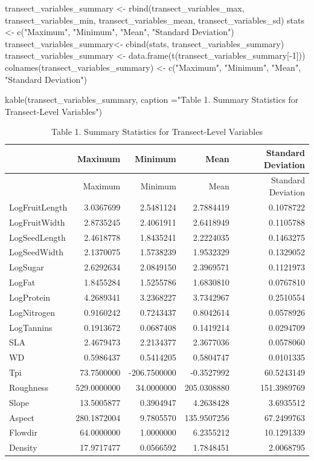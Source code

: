 \documentclass[
  12pt,
]{article}
\newenvironment{Shaded}{\begin{snugshade}}{\end{snugshade}}
\newcommand{\AttributeTok}[1]{\textcolor[rgb]{0.77,0.63,0.00}{#1}}
\newcommand{\DecValTok}[1]{\textcolor[rgb]{0.00,0.00,0.81}{#1}}
\newcommand{\FunctionTok}[1]{\textcolor[rgb]{0.00,0.00,0.00}{#1}}
\newcommand{\NormalTok}[1]{#1}
\newcommand{\OtherTok}[1]{\textcolor[rgb]{0.56,0.35,0.01}{#1}}
\newcommand{\SpecialCharTok}[1]{\textcolor[rgb]{0.00,0.00,0.00}{#1}}
\newcommand{\StringTok}[1]{\textcolor[rgb]{0.31,0.60,0.02}{#1}}
\begin{document}
\begin{Shaded}
\begin{Highlighting}[]
\NormalTok{transect\_variables\_summary }\OtherTok{\textless{}{-}} \FunctionTok{rbind}\NormalTok{(transect\_variables\_max, transect\_variables\_min, transect\_variables\_mean, transect\_variables\_sd)}
\NormalTok{stats }\OtherTok{\textless{}{-}} \FunctionTok{c}\NormalTok{(}\StringTok{"Maximum"}\NormalTok{, }\StringTok{"Minimum"}\NormalTok{, }\StringTok{"Mean"}\NormalTok{, }\StringTok{"Standard Deviation"}\NormalTok{)}
\NormalTok{transect\_variables\_summary}\OtherTok{\textless{}{-}} \FunctionTok{cbind}\NormalTok{(stats, transect\_variables\_summary)}
\NormalTok{transect\_variables\_summary }\OtherTok{\textless{}{-}} \FunctionTok{data.frame}\NormalTok{(}\FunctionTok{t}\NormalTok{(transect\_variables\_summary[}\SpecialCharTok{{-}}\DecValTok{1}\NormalTok{]))}
\FunctionTok{colnames}\NormalTok{(transect\_variables\_summary) }\OtherTok{\textless{}{-}} \FunctionTok{c}\NormalTok{(}\StringTok{"Maximum"}\NormalTok{, }\StringTok{"Minimum"}\NormalTok{, }\StringTok{"Mean"}\NormalTok{, }\StringTok{"Standard Deviation"}\NormalTok{)}

\FunctionTok{kable}\NormalTok{(transect\_variables\_summary, }\AttributeTok{caption =}\StringTok{"Table 1. Summary Statistics for Transect{-}Level Variables"}\NormalTok{)}
\end{Highlighting}
\end{Shaded}

\begin{longtable}[]{@{}lrrrr@{}}
\caption{Table 1. Summary Statistics for Transect-Level
Variables}\tabularnewline
\toprule
& Maximum & Minimum & Mean & Standard Deviation\tabularnewline
\midrule
\endfirsthead
\toprule
& Maximum & Minimum & Mean & Standard Deviation\tabularnewline
\midrule
\endhead
LogFruitLength & 3.0367699 & 2.5481124 & 2.7884419 &
0.1078722\tabularnewline
LogFruitWidth & 2.8735245 & 2.4061911 & 2.6418949 &
0.1105788\tabularnewline
LogSeedLength & 2.4618778 & 1.8435241 & 2.2224035 &
0.1463275\tabularnewline
LogSeedWidth & 2.1370075 & 1.5738239 & 1.9532329 &
0.1329052\tabularnewline
LogSugar & 2.6292634 & 2.0849150 & 2.3969571 & 0.1121973\tabularnewline
LogFat & 1.8455284 & 1.5255786 & 1.6830810 & 0.0767810\tabularnewline
LogProtein & 4.2689341 & 3.2368227 & 3.7342967 &
0.2510554\tabularnewline
LogNitrogen & 0.9160242 & 0.7243437 & 0.8042614 &
0.0578926\tabularnewline
LogTannins & 0.1913672 & 0.0687408 & 0.1419214 &
0.0294709\tabularnewline
SLA & 2.4679473 & 2.2134377 & 2.3677036 & 0.0578060\tabularnewline
WD & 0.5986437 & 0.5414205 & 0.5804747 & 0.0101335\tabularnewline
Tpi & 73.7500000 & -206.7500000 & -0.3527992 & 60.5243149\tabularnewline
Roughness & 529.0000000 & 34.0000000 & 205.0308880 &
151.3989769\tabularnewline
Slope & 13.5005877 & 0.3904947 & 4.2638428 & 3.6935512\tabularnewline
Aspect & 280.1872004 & 9.7805570 & 135.9507256 &
67.2499763\tabularnewline
Flowdir & 64.0000000 & 1.0000000 & 6.2355212 & 10.1291339\tabularnewline
Density & 17.9717477 & 0.0566592 & 1.7848451 & 2.0068795\tabularnewline
\bottomrule
\end{longtable}
\end{document}
